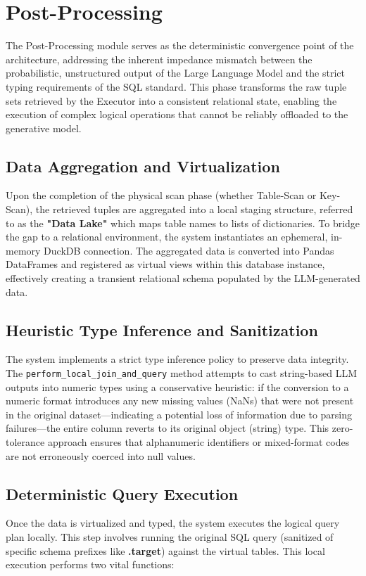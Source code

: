 \section{Post-Processing}
The Post-Processing module serves as the deterministic convergence point of the architecture, addressing the inherent impedance mismatch between the probabilistic, unstructured output of the Large Language Model and the strict typing requirements of the SQL standard.
 This phase transforms the raw tuple sets retrieved by the Executor into a consistent relational state, enabling the execution of complex logical operations that cannot be reliably offloaded to the generative model.

 \subsection{Data Aggregation and Virtualization}
 Upon the completion of the physical scan phase (whether Table-Scan or Key-Scan), the retrieved tuples are aggregated into a local staging structure, referred to as the \textbf{"Data Lake"} which maps table names to lists of dictionaries. To bridge the gap to a relational environment, the system instantiates an ephemeral, in-memory DuckDB connection. The aggregated data is converted into Pandas DataFrames and registered as virtual views within this database instance, effectively creating a transient relational schema populated by the LLM-generated data.

 \subsection{Heuristic Type Inference and Sanitization}
 The system implements a strict type inference policy to preserve data integrity. The \texttt{perform\_local\_join\_and\_query} method attempts to cast string-based LLM outputs into numeric types using a conservative heuristic: if the conversion to a numeric format introduces any new missing values (NaNs) that were not present in the original dataset—indicating a potential loss of information due to parsing failures—the entire column reverts to its original object (string) type. This zero-tolerance approach ensures that alphanumeric identifiers or mixed-format codes are not erroneously coerced into null values.

 \subsection{Deterministic Query Execution}
 Once the data is virtualized and typed, the system executes the logical query plan locally. This step involves running the original SQL query (sanitized of specific schema prefixes like \textbf{.target}) against the virtual tables. This local execution performs two vital functions:

